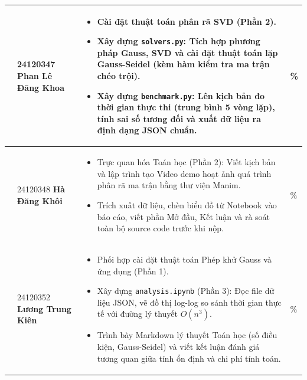 \begin{longtable}{|p{}|p{}|>{\linespread{1.3}\selectfont\arraybackslash}p{}|p{}|}
    \centering 2 & 
    24120347 \newline \textbf{Phan Lê Đăng Khoa} & 
    \vspace{-0.4cm}
    \begin{itemize}[itemsep=0.15cm, topsep=0cm, partopsep=0cm]
        \item Cài đặt thuật toán phân rã SVD (Phần 2).
        \item Xây dựng \texttt{solvers.py}: Tích hợp phương pháp Gauss, SVD và cài đặt thuật toán lặp Gauss-Seidel (kèm hàm kiểm tra ma trận chéo trội).
        \item Xây dựng \texttt{benchmark.py}: Lên kịch bản đo thời gian thực thi (trung bình 5 vòng lặp), tính sai số tương đối và xuất dữ liệu ra định dạng JSON chuẩn.
    \end{itemize} \vspace{-0.2cm} & 
    \centering 100\% \tabularnewline \hline
    
    \centering 3 & 
    24120348 \newline \textbf{Hà Đăng Khôi} & 
    \vspace{-0.4cm}
    \begin{itemize}[itemsep=0.15cm, topsep=0cm, partopsep=0cm]
        \item Trực quan hóa Toán học (Phần 2): Viết kịch bản và lập trình tạo Video demo hoạt ảnh quá trình phân rã ma trận bằng thư viện Manim.
        \item Trích xuất dữ liệu, chèn biểu đồ từ Notebook vào báo cáo, viết phần Mở đầu, Kết luận và rà soát toàn bộ source code trước khi nộp.
    \end{itemize} \vspace{-0.2cm} & 
    \centering 100\% \tabularnewline \hline

    \centering 4 & 
    24120352 \newline \textbf{Lương Trung Kiên} & 
    \vspace{-0.4cm}
    \begin{itemize}[itemsep=0.15cm, topsep=0cm, partopsep=0cm]
        \item Phối hợp cài đặt thuật toán Phép khử Gauss và ứng dụng (Phần 1).
        \item Xây dựng \texttt{analysis.ipynb} (Phần 3): Đọc file dữ liệu JSON, vẽ đồ thị log-log so sánh thời gian thực tế với đường lý thuyết $O(n^3)$.
        \item Trình bày Markdown lý thuyết Toán học (số điều kiện, Gauss-Seidel) và viết kết luận đánh giá tương quan giữa tính ổn định và chi phí tính toán.
    \end{itemize} \vspace{-0.2cm} & 
    \centering 100\% \tabularnewline \hline
    

\end{longtable}
